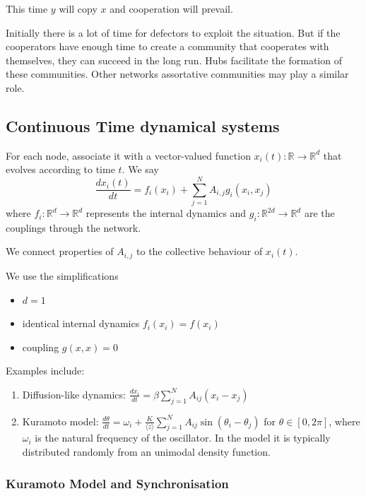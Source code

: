 \documentclass[12pt]{article}
\theoremstyle{definition}
\begin{document}
This time $y$ will copy $x$ and cooperation will prevail.

Initially there is a lot of time for defectors to exploit the situation. But if the cooperators have enough time to create a community that cooperates with themselves, they can succeed in the long run. Hubs facilitate the formation of these communities. Other networks assortative communities may play a similar role.

\subsection{Continuous Time dynamical systems}

For each node, associate it with a vector-valued function $x_i(t)\colon \mathbb R\to \mathbb R^d$ that evolves according to time $t$. We say 
\begin{equation}
\frac{dx_i(t)}{dt} = f_i(x_i) + \sum_{j=1}^N A_{i,j} g_i(x_i, x_j)    
\end{equation}
where $f_i\colon \mathbb R^d \to \mathbb R^d$ represents the internal dynamics and $g_i\colon \mathbb R^{2d}\to \mathbb R^d$ are the couplings through the network. 

We connect properties of $A_{i,j}$ to the collective behaviour of $x_i(t)$. 

We use the simplifications
\begin{itemize}
    \item $d=1$
    \item identical internal dynamics $f_i(x_i)=f(x_i)$
    \item coupling $g(x,x)=0$
\end{itemize}

Examples include: 
\begin{enumerate}
    \item Diffusion-like dynamics: $\frac{dx_i}{dt}=\beta\sum_{j=1}^NA_{ij}(x_i-x_j)$
    \item Kuramoto model: $\frac{d\theta}{dt}=\omega_i+\frac{K}{\langle z\rangle}\sum_{j=1}^NA_{ij}\sin(\theta_i-\theta_j)$ for $\theta\in[0,2\pi]$, where $\omega_i$ is the natural frequency of the oscillator. In the model it is typically distributed randomly from an unimodal density function. 
\end{enumerate}

\subsubsection{Kuramoto Model and Synchronisation}
\end{document}
